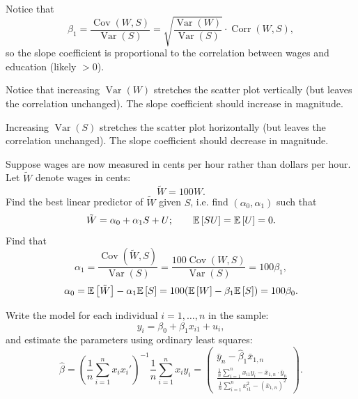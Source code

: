 \begin{remark}
	Notice that
	\[
		\beta_1=\frac{\operatorname{Cov}(W,S)}{\operatorname{Var}(S)}=\sqrt{\frac{\operatorname{Var}(W)}{\operatorname{Var}(S)}}\cdot\operatorname{Corr}(W,S),
	\]
	so the slope coefficient is proportional to the correlation between wages and education (likely $>0$).

	Notice that increasing $\operatorname{Var}(W)$ stretches the scatter plot vertically (but leaves the correlation unchanged). The slope coefficient should increase in magnitude.

	Increasing $\operatorname{Var}(S)$ stretches the scatter plot horizontally (but leaves the correlation unchanged). The slope coefficient should decrease in magnitude.
\end{remark}

\begin{example}
	Suppose wages are now measured in cents per hour rather than dollars per hour. Let $\tilde W$ denote wages in cents:
	\[
		\tilde W=100W.
	\]
	Find the best linear predictor of $\tilde W$ given $S$, i.e. find $(\alpha_0,\alpha_1)$ such that
	\[
		\tilde W=\alpha_0+\alpha_1S+U;\qquad \mathbb{E}\left[SU\right]=\mathbb{E}\left[U\right]=0.
	\]
	Find that
	\[
		\alpha_1=\frac{\operatorname{Cov}(\tilde W,S)}{\operatorname{Var}(S)}=\frac{100\operatorname{Cov}(W,S)}{\operatorname{Var}(S)}=100\beta_1,
	\]
	\[
		\alpha_0=\mathbb{E}\left[\tilde W\right]-\alpha_1\mathbb{E}\left[S\right]=100(\mathbb{E}\left[W\right]-\beta_1\mathbb{E}\left[S\right])=100\beta_0.
	\]
\end{example}

\begin{example}
	Write the model for each individual $i=1,\ldots,n$ in the sample:
	\[
		y_i=\beta_0+\beta_1x_{i1}+u_i,
	\]
	and estimate the parameters using ordinary least squares:
	\[
		\hat\beta=\left(\frac{1}{n}\sum_{i=1}^n x_ix_i'\right)^{-1}\frac{1}{n}\sum_{i=1}^n x_iy_i
		=\begin{pmatrix}
			\bar y_n-\hat\beta_1\bar x_{1,n} \\
			\frac{\frac{1}{n}\sum_{i=1}^n x_{i1}y_i-\bar x_{1,n}\cdot\bar y_n}{\frac{1}{n}\sum_{i=1}^n x_{i1}^2-(\bar x_{1,n})^2}
		\end{pmatrix}.
	\]
\end{example}

